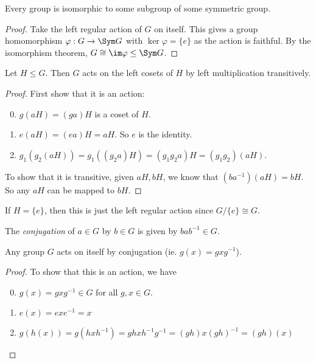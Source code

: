 \documentclass[a4paper]{article}
\begin{document}
  \begin{thm}
    Every group is isomorphic to some subgroup of some symmetric group.
  \end{thm}

  \begin{proof}
    Take the left regular action of $G$ on itself. This gives a group homomorphism $\varphi: G\to \Sym G$ with $\ker \varphi = \{e\}$ as the action is faithful. By the isomorphism theorem, $G \cong \im \varphi \leq \Sym G$.
  \end{proof}

  \begin{lemma}
    Let $H\leq G$. Then $G$ acts on the left cosets of $H$ by left multiplication transitively.
  \end{lemma}

  \begin{proof}
    First show that it is an action:
    \begin{enumerate}[label=\arabic{*}.]
        \setcounter{enumi}{-1}
      \item $g(aH) = (ga)H$ is a coset of $H$.
      \item $e(aH) = (ea)H = aH$. So $e$ is the identity.
      \item $g_1(g_2(aH)) = g_1((g_2a)H) = (g_1g_2a)H = (g_1g_2)(aH)$.
    \end{enumerate}

    To show that it is transitive, given $aH, bH$, we know that $(ba^{-1})(aH) = bH$. So any $aH$ can be mapped to $bH$.
  \end{proof}
  \note If $H = \{e\}$, then this is just the left regular action since $G/\{e\} \cong G$.

  \begin{defi}
    The \emph{conjugation} of $a\in G$ by $b\in G$ is given by $bab^{-1}\in G$.
  \end{defi}

  \begin{lemma}
    Any group $G$ acts on itself by conjugation (ie. $g(x) = gxg^{-1}$).
  \end{lemma}

  \begin{proof}
    To show that this is an action, we have
    \begin{enumerate}[label=\arabic{*}.]
        \setcounter{enumi}{-1}
      \item $g(x) = gxg^{-1} \in G$ for all $g, x\in G$.
      \item $e(x) = exe^{-1} = x$
      \item $g(h(x)) = g(hxh^{-1}) = ghxh^{-1}g^{-1} = (gh)x(gh)^{-1} = (gh)(x)$
    \end{enumerate}
  \end{proof}
\end{document}
